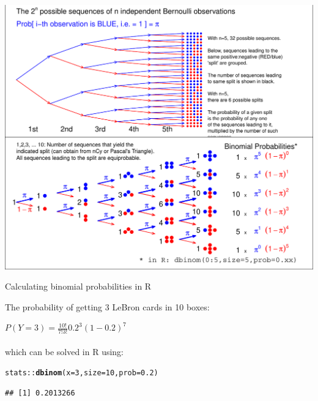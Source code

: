 \documentclass[10pt]{beamer}\usepackage[]{graphicx}\usepackage[]{color}
\makeatletter
\def\maxwidth{ %
  \ifdim\Gin@nat@width>\linewidth
    \linewidth
  \else
    \Gin@nat@width
  \fi
}
\newcommand{\hlnum}[1]{\textcolor[rgb]{0.686,0.059,0.569}{#1}}%
\newcommand{\hlopt}[1]{\textcolor[rgb]{0,0,0}{#1}}%
\newcommand{\hlstd}[1]{\textcolor[rgb]{0.345,0.345,0.345}{#1}}%
\newcommand{\hlkwc}[1]{\textcolor[rgb]{0.333,0.667,0.333}{#1}}%
\newcommand{\hlkwd}[1]{\textcolor[rgb]{0.737,0.353,0.396}{\textbf{#1}}}%
\newenvironment{kframe}{%
 \def\at@end@of@kframe{}%
 \ifinner\ifhmode%
  \def\at@end@of@kframe{\end{minipage}}%
  \begin{minipage}{\columnwidth}%
 \fi\fi%
 \def\FrameCommand##1{\hskip\@totalleftmargin \hskip-\fboxsep
 \colorbox{shadecolor}{##1}\hskip-\fboxsep
     \hskip-\linewidth \hskip-\@totalleftmargin \hskip\columnwidth}%
 \MakeFramed {\advance\hsize-\width
   \@totalleftmargin\z@ \linewidth\hsize
   \@setminipage}}%
 {\par\unskip\endMakeFramed%
 \at@end@of@kframe}
\newenvironment{knitrout}{}{} %
\makeatother
\begin{document}
\begin{frame}[fragile]{}
\begin{knitrout}\tiny
{}\color{fgcolor}

{\centering \includegraphics[width=\maxwidth]{figure/unnamed-chunk-3-1} 

}


\end{knitrout}
\end{frame}


\begin{frame}[fragile]{Calculating binomial probabilities in R}
	
	The probability of getting 3 LeBron cards in 10 boxes:
	
	\vspace{.21in}
	
	$P(Y=3) = \frac{10!}{7!3!}0.2^3(1-0.2)^{7}$ \\ \ \\
	which can be solved in R using:
\begin{knitrout}\tiny
{}\color{fgcolor}\begin{kframe}
\begin{alltt}
\hlstd{stats}\hlopt{::}\hlkwd{dbinom}\hlstd{(}\hlkwc{x} \hlstd{=} \hlnum{3}\hlstd{,} \hlkwc{size} \hlstd{=} \hlnum{10}\hlstd{,} \hlkwc{prob} \hlstd{=} \hlnum{0.2}\hlstd{)}
\end{alltt}
\begin{verbatim}
## [1] 0.2013266
\end{verbatim}
\end{kframe}
\end{knitrout}
\end{frame}
\end{document}
